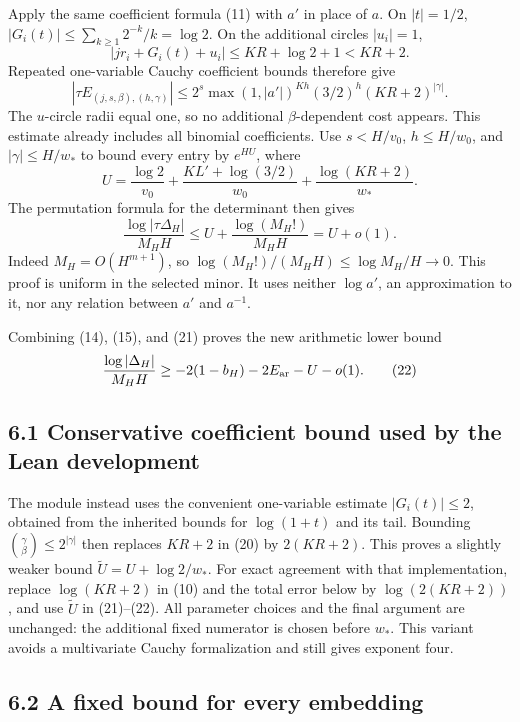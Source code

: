 \documentclass[11pt]{article}
\begin{document}
Apply the same coefficient formula (11) with \(a'\) in place of \(a\).
On \(|t|=1/2\), \(|G_i(t)|\le\sum_{k\ge1}2^{-k}/k=\log2\). On the
additional circles \(|u_i|=1\), \[
|jr_i+G_i(t)+u_i|\le KR+\log2+1<KR+2.
\] Repeated one-variable Cauchy coefficient bounds therefore give \[
|\tau E_{(j,s,\beta),(h,\gamma)}|
\le 2^s\max(1,|a'|)^{Kh}(3/2)^h(KR+2)^{|\gamma|}.
\] The \(u\)-circle radii equal one, so no additional
\(\beta\)-dependent cost appears. This estimate already includes all
binomial coefficients. Use \(s<H/v_0\), \(h\le H/w_0\), and
\(|\gamma|\le H/w_*\) to bound every entry by \(e^{HU}\), where \[
U=\frac{\log2}{v_0}+\frac{KL'+\log(3/2)}{w_0}
+\frac{\log(KR+2)}{w_*}.                            \tag{20}
\] The permutation formula for the determinant then gives \[
\frac{\log|\tau\Delta_H|}{M_HH}\le
U+\frac{\log(M_H!)}{M_HH}=U+o(1).                   \tag{21}
\] Indeed \(M_H=O(H^{m+1})\), so \(\log(M_H!)/(M_HH)\le\log M_H/H\to0\).
This proof is uniform in the selected minor. It uses neither
\(\log a'\), an approximation to it, nor any relation between \(a'\) and
\(a^{-1}\).

Combining (14), (15), and (21) proves the new arithmetic lower bound \[
\frac{\log|\Delta_H|}{M_HH}
\ge-2(1-b_H)-2E_{\rm ar}-U-o(1).                  \tag{22}
\]

\subsection{6.1 Conservative coefficient bound used by the Lean
development}\label{conservative-coefficient-bound-used-by-the-lean-development}

The module  instead uses the convenient
one-variable estimate \(|G_i(t)|\le2\), obtained from the inherited
bounds for \(\log(1+t)\) and its tail. Bounding
\(\binom\gamma\beta\le2^{|\gamma|}\) then replaces \(KR+2\) in (20) by
\(2(KR+2)\). This proves a slightly weaker bound
\(\widetilde U=U+\log2/w_*\). For exact agreement with that
implementation, replace \(\log(KR+2)\) in (10) and the total error below
by \(\log(2(KR+2))\), and use \(\widetilde U\) in (21)--(22). All
parameter choices and the final argument are unchanged: the additional
fixed numerator is chosen before \(w_*\). This variant avoids a
multivariate Cauchy formalization and still gives exponent four.

\subsection{6.2 A fixed bound for every
embedding}\label{a-fixed-bound-for-every-embedding}
\end{document}

